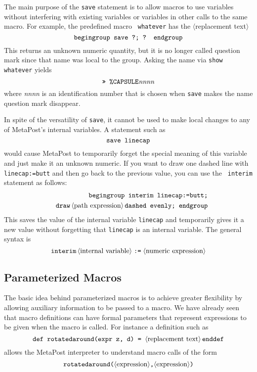 \documentclass{article} %
\newcommand\descr[1]{{\langle\hbox{#1}\rangle}}
\newcommand\invisgap{\nobreak\hskip0pt\relax}
\newcommand\tdescr[1]{$\langle$\invisgap#1\invisgap$\rangle$}
\begin{document}
The main purpose of the {\tt save} statement is to allow macros to use
variables without interfering with existing variables or variables in
other calls to the same macro.  For example, the predefined macro {\tt
whatever} has the \tdescr{replacement text}
$$ \hbox{\tt begingroup save ?; ? endgroup} $$
This returns an unknown numeric quantity, but it is no longer called
question mark since that name was local to the group.  Asking the name
via {\tt show whatever}
yields
$$ \hbox{\tt >> \%CAPSULE}{\it nnnn} $$
where {\it nnnn} is an identification number that is chosen when {\tt save}
makes the name question mark disappear.

In spite of the versatility of {\tt save}, it cannot be used to make
local changes to any of MetaPost's internal variables.  A statement such
as
$$ \hbox{\tt save linecap} $$
would cause MetaPost to temporarily forget the special meaning of this
variable and just make it an unknown numeric.  If you want to draw one
dashed line with {\tt linecap:=butt} and then go back to the previous
value, you can use the {\tt
interim}\label{Dinterm} statement as
follows:
\begin{eqnarray*}
&& \hbox{\tt begingroup interim linecap:=butt;}\\
&& {\tt draw}\, \descr{path expression}\, \hbox{\tt dashed evenly; endgroup}
\end{eqnarray*}
This saves the value of the
internal variable
{\tt linecap} and temporarily
gives it a new value without forgetting that {\tt linecap} is an internal
variable.  The general syntax is
$$ {\tt interim}\, \descr{internal variable} \mathrel{\hbox{\tt:=}}
        \descr{numeric expression}
$$


\subsection{Parameterized Macros}

The basic idea behind parameterized macros is to achieve greater flexibility by
allowing auxiliary information to be passed to a macro.  We have already seen
that macro definitions can have formal parameters that represent expressions
to be given when the macro is called.  For instance a definition such as
$$ \hbox{\tt def rotatedaround(expr z, d) = } \descr{replacement text}\,
   {\tt enddef}
$$
allows the MetaPost interpreter to understand macro calls of the form
$$\tt rotatedaround\hbox{\tt (}
  \descr{expression}\hbox{\tt ,} \descr{expression}\hbox{\tt )}
$$
\end{document}

